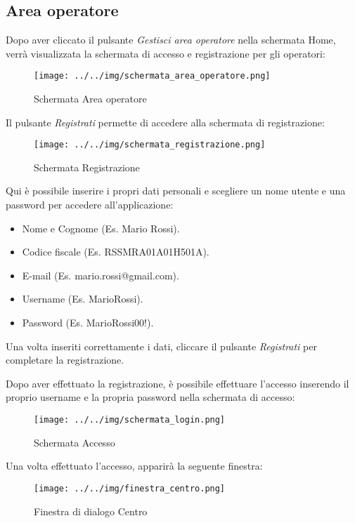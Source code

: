 \subsection{Area operatore}
Dopo aver cliccato il pulsante \emph{Gestisci area operatore} nella schermata Home, verrà visualizzata la schermata di accesso e registrazione per gli operatori:
\begin{figure}[H]
    \centering
    \texttt{[image: ../../img/schermata\_area\_operatore.png]}
    \caption{Schermata Area operatore}
\end{figure}

Il pulsante \emph{Registrati} permette di accedere alla schermata di registrazione:
\begin{figure}[H]
    \centering
    \texttt{[image: ../../img/schermata\_registrazione.png]}
    \caption{Schermata Registrazione}
\end{figure}

Qui è possibile inserire i propri dati personali e scegliere un nome utente e una password per accedere all'applicazione:
\begin{itemize}
    \item Nome e Cognome (Es. Mario Rossi).
    \item Codice fiscale (Es. RSSMRA01A01H501A).
    \item E-mail (Es. mario.rossi@gmail.com).
    \item Username (Es. MarioRossi).
    \item Password (Es. MarioRossi00!).
\end{itemize}

Una volta inseriti correttamente i dati, cliccare il pulsante \emph{Registrati} per completare la registrazione.

Dopo aver effettuato la registrazione, è possibile effettuare l'accesso inserendo il proprio username e la propria password nella schermata di accesso:
\begin{figure}[H]
    \centering
    \texttt{[image: ../../img/schermata\_login.png]}
    \caption{Schermata Accesso}
\end{figure}

Una volta effettuato l'accesso, apparirà la seguente finestra: 
\begin{figure}[H]
    \centering
    \texttt{[image: ../../img/finestra\_centro.png]}
    \caption{Finestra di dialogo Centro}
\end{figure}

